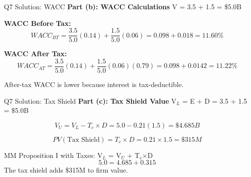 \documentclass[aspectratio=169,10pt]{beamer}
\renewcommand{\small}{\fontsize{6pt}{7.5pt}\selectfont}
\renewcommand{\large}{\fontsize{8pt}{10pt}\selectfont}
\newcommand{\question}[1]{{\large\bfseries\color{crimson}#1}}
\begin{document}
	\begin{frame}{Q7 Solution: WACC}
		\question{Part (b): WACC Calculations}
		\small
		V = 3.5 + 1.5 = \$5.0B
		
		\vspace{0.1cm}
		\textbf{WACC Before Tax:}
		\[
		WACC_{BT} = \frac{3.5}{5.0}(0.14) + \frac{1.5}{5.0}(0.06) = 0.098 + 0.018 = \boxed{11.60\%}
		\]
		
		\vspace{0.1cm}
		\textbf{WACC After Tax:}
		\[
		WACC_{AT} = \frac{3.5}{5.0}(0.14) + \frac{1.5}{5.0}(0.06)(0.79) = 0.098 + 0.0142 = \boxed{11.22\%}
		\]
		
		\vspace{0.1cm}
		\small
		After-tax WACC is lower because interest is tax-deductible.
	\end{frame}
	
	\begin{frame}{Q7 Solution: Tax Shield}
		\question{Part (c): Tax Shield Value}
		\small
		V$_L$ = E + D = 3.5 + 1.5 = \$5.0B
		
		\vspace{0.1cm}
		\[
		V_U = V_L - T_c \times D = 5.0 - 0.21(1.5) = \boxed{\$4.685B}
		\]
		
		\vspace{0.1cm}
		\[
		PV(\text{Tax Shield}) = T_c \times D = 0.21 \times 1.5 = \boxed{\$315M}
		\]
		
		\vspace{0.1cm}
		\small
		MM Proposition I with Taxes: V$_L$ = V$_U$ + T$_c$$\times$D
		\[
		5.0 = 4.685 + 0.315
		\]
		The tax shield adds \$315M to firm value.
	\end{frame}
	
\end{document}
